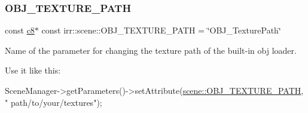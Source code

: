 \subsubsection{\texorpdfstring{O\+B\+J\+\_\+\+T\+E\+X\+T\+U\+R\+E\+\_\+\+P\+A\+TH}{OBJ\_TEXTURE\_PATH}}
{\footnotesize\ttfamily const \hyperlink{namespaceirr_a9395eaea339bcb546b319e9c96bf7410}{c8}$\ast$ const irr\+::scene\+::\+O\+B\+J\+\_\+\+T\+E\+X\+T\+U\+R\+E\+\_\+\+P\+A\+TH = \char`\"{}O\+B\+J\+\_\+\+Texture\+Path\char`\"{}}



Name of the parameter for changing the texture path of the built-\/in obj loader. 

Use it like this\+: 
\begin{DoxyCode}
SceneManager->getParameters()->setAttribute(\hyperlink{namespaceirr_1_1scene_a12d0b16f969fdaaf7c2161a0c7152b54}{scene::OBJ\_TEXTURE\_PATH}, \textcolor{stringliteral}{"
      path/to/your/textures"});
\end{DoxyCode}
 